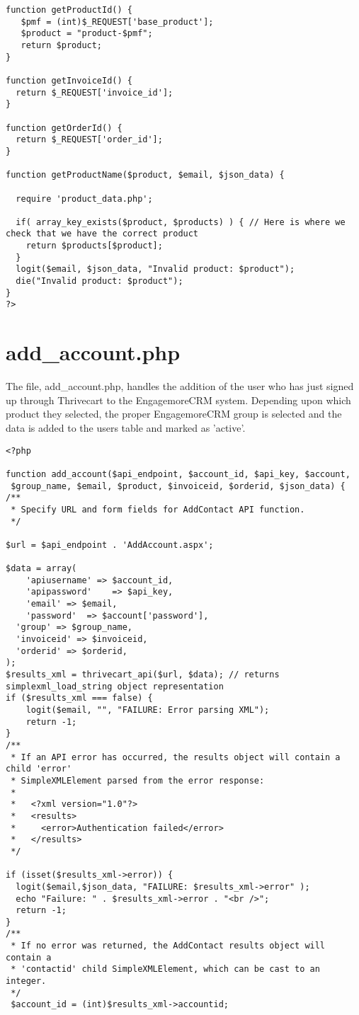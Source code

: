 \documentclass[final,letterpaper,12pt]{article}
\begin{document}
\begin{appendices}
\begin{verbatim}
function getProductId() {
   $pmf = (int)$_REQUEST['base_product'];
   $product = "product-$pmf";
   return $product;
}

function getInvoiceId() {
  return $_REQUEST['invoice_id'];
}

function getOrderId() {
  return $_REQUEST['order_id'];
}

function getProductName($product, $email, $json_data) {

  require 'product_data.php';

  if( array_key_exists($product, $products) ) { // Here is where we check that we have the correct product
    return $products[$product];
  }
  logit($email, $json_data, "Invalid product: $product");
  die("Invalid product: $product");
}
?>
\end{verbatim}
\section{add\_account.php}
\noindent The file, add\_account.php, handles the addition of the user who has just signed up through Thrivecart to the EngagemoreCRM system.  Depending upon which product they selected, the proper EngagemoreCRM group is selected and the data is added to the users table and marked as 'active'.
\begin{verbatim}
<?php

function add_account($api_endpoint, $account_id, $api_key, $account,
 $group_name, $email, $product, $invoiceid, $orderid, $json_data) {
/**
 * Specify URL and form fields for AddContact API function.
 */

$url = $api_endpoint . 'AddAccount.aspx';

$data = array(
	'apiusername' => $account_id,
	'apipassword'    => $api_key,
	'email' => $email,
	'password'  => $account['password'],
  'group' => $group_name,
  'invoiceid' => $invoiceid,
  'orderid' => $orderid,
);
$results_xml = thrivecart_api($url, $data); // returns simplexml_load_string object representation
if ($results_xml === false) {
	logit($email, "", "FAILURE: Error parsing XML");
	return -1;
}
/**
 * If an API error has occurred, the results object will contain a child 'error'
 * SimpleXMLElement parsed from the error response:
 *
 *   <?xml version="1.0"?>
 *   <results>
 *     <error>Authentication failed</error>
 *   </results>
 */

if (isset($results_xml->error)) {
  logit($email,$json_data, "FAILURE: $results_xml->error" );
  echo "Failure: " . $results_xml->error . "<br />";
  return -1;
}
/**
 * If no error was returned, the AddContact results object will contain a
 * 'contactid' child SimpleXMLElement, which can be cast to an integer.
 */
 $account_id = (int)$results_xml->accountid;


\end{verbatim}
\end{appendices}
\end{document}

